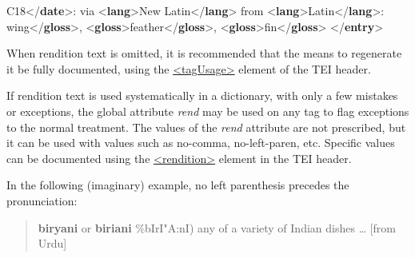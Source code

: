 \begin{shaded}
\mbox{}\newline 
{}\mbox{}\newline 
\hspace*{1em}C18{</\textbf{date}>}: via {<\textbf{lang}>}New Latin{</\textbf{lang}>} from {<\textbf{lang}>}Latin{</\textbf{lang}>}:\mbox{}\newline 
{}wing{</\textbf{gloss}>}, {<\textbf{gloss}>}feather{</\textbf{gloss}>}, {<\textbf{gloss}>}fin{</\textbf{gloss}>}\mbox{}\newline 
{}\mbox{}\newline 
{</\textbf{entry}>}\end{shaded}\egroup\par \par
When rendition text is omitted, it is recommended that the means to regenerate it be fully documented, using the \hyperref[TEI.tagUsage]{<tagUsage>} element of the TEI header.\par
If rendition text is used systematically in a dictionary, with only a few mistakes or exceptions, the global attribute {\itshape rend} may be used on any tag to flag exceptions to the normal treatment. The values of the {\itshape rend} attribute are not prescribed, but it can be used with values such as no-comma, no-left-paren, etc. Specific values can be documented using the \hyperref[TEI.rendition]{<rendition>} element in the TEI header.\par
In the following (imaginary) example, no left parenthesis precedes the pronunciation:
\begin{quote}{\bfseries biryani} or {\bfseries biriani} \%bIrI"A:nI) any of a variety of Indian dishes … [from Urdu]\end{quote}

